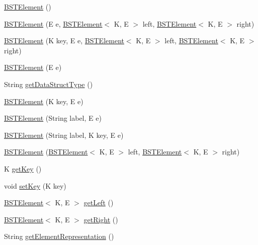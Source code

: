 \begin{DoxyCompactItemize}
\item 
\hyperlink{classbridges_1_1base_1_1_b_s_t_element_a5a557bf3e29e2936c244147c69e04795}{B\+S\+T\+Element} ()
\item 
\hyperlink{classbridges_1_1base_1_1_b_s_t_element_a0ec94ad6e2313ada05b48eb83a2f31cb}{B\+S\+T\+Element} (E e, \hyperlink{classbridges_1_1base_1_1_b_s_t_element}{B\+S\+T\+Element}$<$ K, E $>$ left, \hyperlink{classbridges_1_1base_1_1_b_s_t_element}{B\+S\+T\+Element}$<$ K, E $>$ right)
\item 
\hyperlink{classbridges_1_1base_1_1_b_s_t_element_a6b5bae96b241996942c467a78e6262ea}{B\+S\+T\+Element} (K key, E e, \hyperlink{classbridges_1_1base_1_1_b_s_t_element}{B\+S\+T\+Element}$<$ K, E $>$ left, \hyperlink{classbridges_1_1base_1_1_b_s_t_element}{B\+S\+T\+Element}$<$ K, E $>$ right)
\item 
\hyperlink{classbridges_1_1base_1_1_b_s_t_element_aa40760e586322a406841765bcf2aafc6}{B\+S\+T\+Element} (E e)
\item 
String \hyperlink{classbridges_1_1base_1_1_b_s_t_element_ae51e96c80d61e1a6c74f6d56a4bc2fef}{get\+Data\+Struct\+Type} ()
\item 
\hyperlink{classbridges_1_1base_1_1_b_s_t_element_ae19a9a445ae112673edf57a24dcf38e9}{B\+S\+T\+Element} (K key, E e)
\item 
\hyperlink{classbridges_1_1base_1_1_b_s_t_element_ab4a92ca5d5bdd5966bd63def8e867173}{B\+S\+T\+Element} (String label, E e)
\item 
\hyperlink{classbridges_1_1base_1_1_b_s_t_element_a6b76778c0c1486f599b90e51cf0a477c}{B\+S\+T\+Element} (String label, K key, E e)
\item 
\hyperlink{classbridges_1_1base_1_1_b_s_t_element_a067f0fcc18228e8c9427deadba9f4d96}{B\+S\+T\+Element} (\hyperlink{classbridges_1_1base_1_1_b_s_t_element}{B\+S\+T\+Element}$<$ K, E $>$ left, \hyperlink{classbridges_1_1base_1_1_b_s_t_element}{B\+S\+T\+Element}$<$ K, E $>$ right)
\item 
K \hyperlink{classbridges_1_1base_1_1_b_s_t_element_afba950fad36d3327b01003df3ba4cc9f}{get\+Key} ()
\item 
void \hyperlink{classbridges_1_1base_1_1_b_s_t_element_a51990b684df6998dc25b324dc7631ab4}{set\+Key} (K key)
\item 
\hyperlink{classbridges_1_1base_1_1_b_s_t_element}{B\+S\+T\+Element}$<$ K, E $>$ \hyperlink{classbridges_1_1base_1_1_b_s_t_element_a8abdd6e4a0486de7fa45fbb233b56688}{get\+Left} ()
\item 
\hyperlink{classbridges_1_1base_1_1_b_s_t_element}{B\+S\+T\+Element}$<$ K, E $>$ \hyperlink{classbridges_1_1base_1_1_b_s_t_element_ae7ed1b98f48acfcfc0a3a5bf6219ce00}{get\+Right} ()
\item 
String \hyperlink{classbridges_1_1base_1_1_b_s_t_element_a0619c81bb38df6fc64a651a909f64d84}{get\+Element\+Representation} ()
\end{DoxyCompactItemize}
